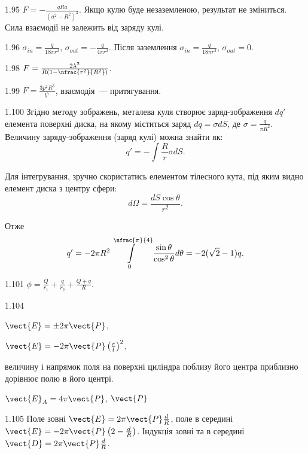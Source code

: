 \begin{Solution}{1.{95}}
	$F = -\frac{qRa}{(a^2 - R^2)^2}$. Якщо кулю буде незаземленою, результат не зміниться. Сила взаємодії не залежить від заряду кулі.
\end{Solution}
\begin{Solution}{1.{96}}
	$\sigma_{in} = \frac{q}{18\pi r^2}$, $\sigma_{out} = - \frac{q}{4\pi r^2}$. Після заземлення $\sigma_{in} = \frac{q}{18\pi r^2}$, $\sigma_{out} = 0$.
\end{Solution}
\begin{Solution}{1.{98}}
	$F = \frac{2\lambda^2}{R\left( 1 - \nfrac{r^2}{R^2}\right) }$.
\end{Solution}
\begin{Solution}{1.{99}}
	$F = \frac{3p^2R^3}{b^7}$, взаємодія~--- притягування.
\end{Solution}
\begin{Solution}{1.{100}}
	Згідно методу зображень, металева куля створює заряд-зображення $dq'$ елемента поверхні диска, на якому міститься заряд $dq = \sigma dS$, де $\sigma = \frac{q}{\pi R^2}$. Величину заряду-зображення (заряд кулі) можна знайти як:
	\[
		q' = - \int\frac{R}{r}\sigma dS.
	\]

	Для інтегрування, зручно скористатись елементом тілесного кута, під яким видно елемент диска з центру сфери:
	\[
		d\Omega = \frac{dS\cos\theta}{r^2}.
	\]

	Отже
	\[
		q' = - 2\pi R^2\int\limits_{0}^{\nfrac{\pi}{4}} \frac{\sin\theta}{\cos^2\theta}d\theta = -2(\sqrt2 - 1)q.
	\]
\end{Solution}
\begin{Solution}{1.{101}}
	$\phi = \frac{Q}{r_1} + \frac{q}{r_2} + \frac{Q+q}{R}$.
\end{Solution}
\begin{Solution}{1.{104}}
		\begin{enumerate*}[label=\alph*)]
			\item $\vect{E} = \pm 2\pi \vect{P}$,
			\item $\vect{E} = -2\pi \vect{P} \left(\frac{r}{l} \right)^2$,
			\item величину і напрямок поля на поверхні циліндра поблизу його центра приблизно дорівнює полю в його центрі.
		\end{enumerate*}
		$\vect{E}_A = 4\pi \vect{P}$, $\vect{P}$
	
\end{Solution}
\begin{Solution}{1.{105}}
		Поле зовні $\vect{E} = 2\pi\vect{P}\frac{d}{R}$, поле в середині $\vect{E} = -2\pi\vect{P}\left( 2 - \frac{d}{R}\right) $.
		Індукція зовні та в середині $\vect{D} = 2\pi\vect{P}\frac{d}{R}$.
	
\end{Solution}
